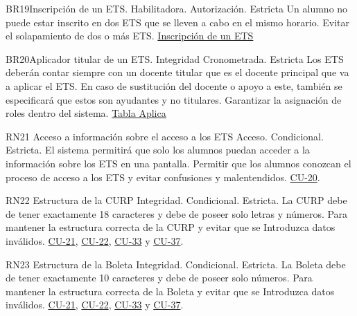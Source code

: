 \begin{BussinesRule}{BR19}{Inscripción de un ETS.} 
    \BRitem[Tipo:] Habilitadora. 
    \BRitem[Clase:] Autorización.
    \BRitem[Nivel:] Estricta
    \BRitem[Descripción:] Un alumno no puede estar inscrito en dos ETS que se lleven a cabo en el mismo horario.
    \BRitem[Motivación:] Evitar el solapamiento de dos o más ETS.
     \hyperlink{InscripcionETS}{Inscripción de un ETS} 
    \end{BussinesRule}

\begin{BussinesRule}{BR20}{Aplicador titular de un ETS.} 
    \BRitem[Tipo:] Integridad
    \BRitem[Clase:] Cronometrada.
    \BRitem[Nivel:] Estricta
    \BRitem[Descripción:] Los ETS deberán contar siempre con un docente titular que es el docente principal que va a aplicar el ETS. En caso de sustitución del docente o apoyo a este, también se especificará que estos son ayudantes y no titulares.
    \BRitem[Motivación:] Garantizar la asignación de roles dentro del sistema.
     \hyperlink{Aplica}{Tabla Aplica} 
    \end{BussinesRule}
    

%
\begin{BussinesRule}{RN21} {Acceso a información sobre el acceso a los ETS}
    \BRitem[Tipo:] Acceso.
    \BRitem[Clase:]Condicional.
    \BRitem[Nivel:] Estricta.
    \BRitem[Descripción:] El sistema permitirá que solo los alumnos puedan acceder a la información sobre los ETS en una pantalla.
    \BRitem[Motivación:] Permitir que los alumnos conozcan el proceso de acceso a los ETS y evitar confusiones y malentendidos.
     \hyperlink{CU-20}{CU-20}.
    \end{BussinesRule}

\begin{BussinesRule}{RN22} {Estructura de la CURP}
    \BRitem[Tipo:]Integridad.
    \BRitem[Clase:]Condicional.
    \BRitem[Nivel:] Estricta.
    \BRitem[Descripción:] La CURP debe de tener exactamente 18 caracteres y debe de poseer solo letras y números.
    \BRitem[Motivación:] Para mantener la estructura correcta de la CURP y evitar que se Introduzca datos inválidos.
     \hyperlink{CU-21}{CU-21}, \hyperlink{CU-22}{CU-22}, \hyperlink{CU-33}{CU-33} y \hyperlink{CU-37}{CU-37}.
    \end{BussinesRule}

\begin{BussinesRule}{RN23} {Estructura de la Boleta}
    \BRitem[Tipo:]Integridad.
    \BRitem[Clase:]Condicional.
    \BRitem[Nivel:] Estricta.
    \BRitem[Descripción:] La Boleta debe de tener exactamente 10 caracteres y debe de poseer solo números.
    \BRitem[Motivación:] Para mantener la estructura correcta de la Boleta y evitar que se Introduzca datos inválidos.
     \hyperlink{CU-21}{CU-21}, \hyperlink{CU-22}{CU-22}, \hyperlink{CU-33}{CU-33} y \hyperlink{CU-37}{CU-37}.
    \end{BussinesRule}

